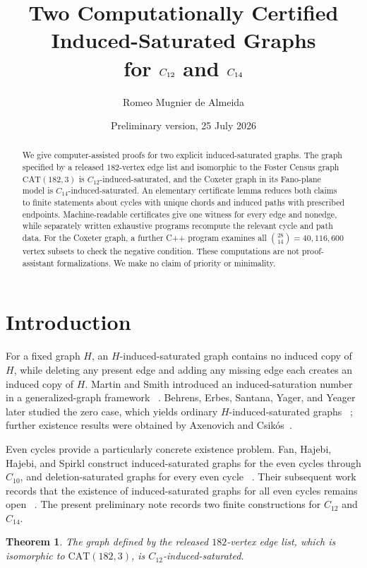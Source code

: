 \documentclass[11pt]{amsart}
\title[Induced-saturated graphs for \(\Ck{12}\) and \(\Ck{14}\)]
{Two Computationally Certified Induced-Saturated Graphs\\
for \(\Ck{12}\) and \(\Ck{14}\)}
\author{Romeo Mugnier de Almeida}
\date{Preliminary version, 25 July 2026}
\newcommand{\Ck}[1]{C_{#1}}
\newtheorem{maintheorem}{Theorem}
\theoremstyle{definition}
\theoremstyle{remark}
\begin{document}
\begin{abstract}
We give computer-assisted proofs for two explicit induced-saturated graphs.
The graph specified by a released \(182\)-vertex edge list and isomorphic to
the Foster Census graph \(\mathrm{CAT}(182,3)\) is
\(\Ck{12}\)-induced-saturated, and the Coxeter graph in its Fano-plane model is
\(\Ck{14}\)-induced-saturated.  An elementary certificate lemma reduces both
claims to finite statements about cycles with unique chords and induced paths
with prescribed endpoints.  Machine-readable certificates give one witness
for every edge and nonedge, while separately written exhaustive programs
recompute the relevant cycle and path data.  For the Coxeter graph, a further
C++ program examines all \(\binom{28}{14}=40{,}116{,}600\) vertex subsets to
check the negative condition.  These computations are not proof-assistant
formalizations.  We make no claim of priority or minimality.
\end{abstract}

\maketitle

\section{Introduction}\label{sec:introduction}

For a fixed graph \(H\), an \(H\)-induced-saturated graph contains no induced
copy of \(H\), while deleting any present edge and adding any missing edge
each creates an induced copy of \(H\).  Martin and Smith introduced an
induced-saturation number in a generalized-graph framework
~\cite{MartinSmith2012}.  Behrens, Erbes, Santana, Yager, and Yeager later
studied the zero case, which yields ordinary \(H\)-induced-saturated graphs
~\cite{BehrensEtAl2016}; further existence results were obtained by Axenovich
and Csik{\'o}s~\cite{AxenovichCsikos2019}.

Even cycles provide a particularly concrete existence problem.  Fan, Hajebi,
Hajebi, and Spirkl construct induced-saturated graphs for the even cycles
through \(\Ck{10}\), and deletion-saturated graphs for every even cycle
~\cite{FanEtAl2025}.  Their subsequent work records that the existence of
induced-saturated graphs for all even cycles remains open
~\cite{FanEtAl2026}.  The present preliminary note records two finite
constructions for \(\Ck{12}\) and \(\Ck{14}\).

\begin{maintheorem}\label{thm:c12}
The graph defined by the released \(182\)-vertex edge list, which is
isomorphic to \(\mathrm{CAT}(182,3)\), is
\(\Ck{12}\)-induced-saturated.
\end{maintheorem}
\end{document}
